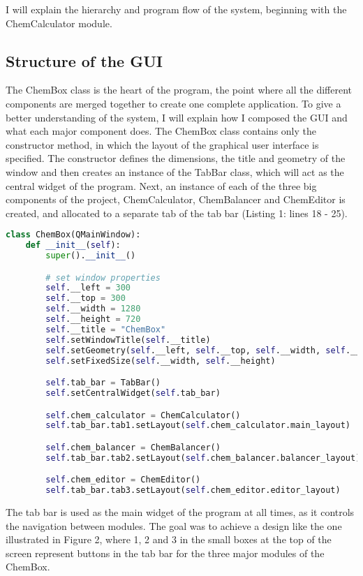\documentclass[a4paper,12pt]{article}
\begin{document}
I will explain the hierarchy and program flow of the system, beginning with the ChemCalculator module.
\newpage

\subsection{Structure of the GUI}

The ChemBox class is the heart of the program, the point where all the different components are merged together to create one complete application. To give a better understanding of the system, I will explain how I composed the GUI and what each major component does. The ChemBox class contains only the constructor method, in which the layout of the graphical user interface is specified. The constructor defines the dimensions, the title and geometry of the window and then creates an instance of the TabBar class, which will act as the central widget of the program. Next, an instance of each of the three big components of the project, ChemCalculator, ChemBalancer and ChemEditor is created, and allocated to a separate tab of the tab bar (Listing 1: lines 18 - 25).

\begin{lstlisting}[language=Python, caption=Code snippet of ChemBox class]
class ChemBox(QMainWindow):
    def __init__(self):
        super().__init__()

        # set window properties
        self.__left = 300
        self.__top = 300
        self.__width = 1280
        self.__height = 720
        self.__title = "ChemBox"
        self.setWindowTitle(self.__title)
        self.setGeometry(self.__left, self.__top, self.__width, self.__height)
        self.setFixedSize(self.__width, self.__height)

        self.tab_bar = TabBar()
        self.setCentralWidget(self.tab_bar)

        self.chem_calculator = ChemCalculator()
        self.tab_bar.tab1.setLayout(self.chem_calculator.main_layout)

        self.chem_balancer = ChemBalancer()
        self.tab_bar.tab2.setLayout(self.chem_balancer.balancer_layout)

        self.chem_editor = ChemEditor()
        self.tab_bar.tab3.setLayout(self.chem_editor.editor_layout)
\end{lstlisting}

\newpage
The tab bar is used as the main widget of the program at all times, as it controls the navigation between modules.
The goal was to achieve a design like the one illustrated in Figure 2, where 1, 2 and 3 in the small boxes at the top of the screen represent buttons in the tab bar for the three major modules of the ChemBox.
\end{document}
